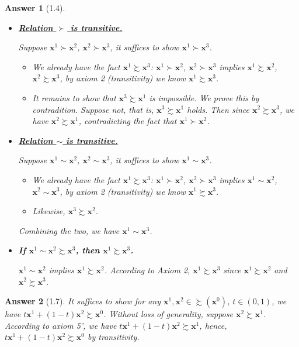 \documentclass{article}
\newtheorem*{ans}{Answer}
\newcommand{\1}{{\bf 1}}
\newcommand{\0}{{\mathbf{0}}}
\newcommand{\x}{{\mathbf{x}}}
\newcommand{\<}{\langle}
\renewcommand{\>}{\rangle}
\begin{document}
\begin{ans}[1.4] \begin{itemize}\item  \textbf{\ul{Relation $\succ$ is transitive.}}
		
		Suppose $\x^1 \succ \x^2 $, $\x^2 \succ \x^3 $, it suffices to show $\x^1 \succ \x^3 $. 
\begin{itemize}
	\item We already have the fact $\x^1 \succsim \x^3 $: $\x^1 \succ \x^2 $, $\x^2 \succ \x^3 $ implies $\x^1 \succsim \x^2 $, $\x^2 \succsim \x^3 $, by axiom 2 (transitivity) we know $\x^1 \succsim \x^3 $.
	\item It remains to show that $\x^3 \succsim \x^1 $ is impossible.  We prove this by contradition. Suppose not, that is, $\x^3 \succsim \x^1 $ holds. Then since $\x^2 \succsim \x^3 $, we have $\x^2 \succsim \x^1 $, contradicting the fact that $\x^1 \succ \x^2 $.
\end{itemize}		
	
	\item  \textbf{\ul{Relation $\sim$ is transitive.}}
	
	Suppose $\x^1 \sim \x^2 $, $\x^2 \sim \x^3 $, it suffices to show $\x^1 \sim \x^3 $. 
\begin{itemize}
	\item We already have the fact $\x^1 \succsim \x^3 $: $\x^1 \succ \x^2 $, $\x^2 \succ \x^3 $ implies $\x^1 \sim \x^2 $, $\x^2 \sim \x^3 $, by axiom 2 (transitivity) we know $\x^1 \succsim \x^3 $.
	\item Likewise, $\x^3 \succsim \x^2 $.
\end{itemize}		
Combining the two, we have $\x^1 \sim  \x^3 $.
	\item 
	
	\textbf{If $\x^1 \sim \x^2 \succsim \x^3$, then $\x^1 \succsim \x^3$.}
	

	
	$ \x^1 \sim \x^2$ implies $\x^1 \succsim \x^2$. According to Axiom 2, $\x^1 \succsim \x^3$ since $\x^1 \succsim \x^2$ and $\x^2 \succsim \x^3$.
	\end{itemize}
\end{ans}

\begin{ans}[1.7] It suffices to show for any $\x^1,\x^2 \in \succsim \left( \x^0 \right)$, $t \in (0,1)$, we have $t \x^1 + (1-t) \x^2 \succsim \x^0$. Without loss of generality, suppose $\x^2 \succsim \x^1$. According to axiom 5', we have 
	$t \x^1 + (1-t) \x^2 \succsim \x^1$, hence, $t \x^1 + (1-t) \x^2 \succsim \x^0$ by transitivity.
\end{ans}
\end{document}

